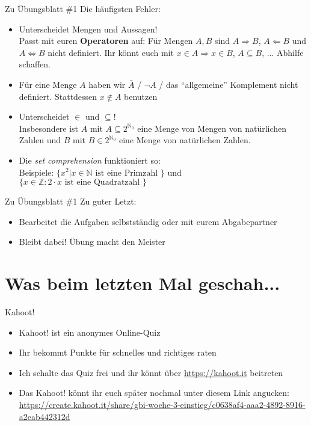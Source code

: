 \begin{frame}{Zu Übungsblatt \#1}
	Die häufigsten Fehler:
	\begin{itemize}[<+->]
		\item Unterscheidet Mengen und Aussagen! \\
		Passt mit euren \textbf{Operatoren} auf: Für Mengen $A,B$ sind $A \Rightarrow B$, $A \Leftarrow B$ und $A \Leftrightarrow B$ nicht definiert.
		\implitem Ihr könnt euch mit $x \in A \Rightarrow x \in B$, $A \subseteq B$, ... Abhilfe schaffen.
		\item Für eine Menge $A$ haben wir $\bar{A}$ / $\neg A$ / das ``allgemeine'' Komplement nicht definiert.
		\implitem Stattdessen $x \not\in A$ benutzen
		\item Unterscheidet $\in$ und $\subseteq$! \\
			Insbesondere ist $A$ mit $A \subseteq 2^{\mathbb{N}_0}$ eine Menge von Mengen von natürlichen Zahlen und $B$ mit $B \in 2^{\mathbb{N}_0}$ eine Menge von natürlichen Zahlen.
		\item Die \textit{set comprehension} funktioniert so: \\
			Beispiele: $\{x^2 | x \in \mathbb{N} \text{ ist eine Primzahl }\}$ und $\{x \in \mathbb{Z} : 2 \cdot x \text{ ist eine Quadratzahl }\}$
	\end{itemize}
\end{frame}

\begin{frame}{Zu Übungsblatt \#1}
	Zu guter Letzt:
	\begin{itemize}[<+->]
		\item Bearbeitet die Aufgaben selbstständig oder mit eurem Abgabepartner
		\item Bleibt dabei! Übung macht den Meister
	\end{itemize}
\end{frame}


\section{Was beim letzten Mal geschah...}

\framePrevEpisode

\begin{frame}{Kahoot!}
	\begin{itemize}[<+->]
		\item Kahoot! ist ein anonymes Online-Quiz
		\item Ihr bekommt Punkte für schnelles und richtiges raten
		\item Ich schalte das Quiz frei und ihr könnt über \url{https://kahoot.it} beitreten
		\item Das Kahoot! könnt ihr euch später nochmal unter diesem Link angucken: \\
			\url{https://create.kahoot.it/share/gbi-woche-3-einstieg/c0638af4-aaa2-4892-8916-a2eab442312d}
	\end{itemize}
\end{frame}


